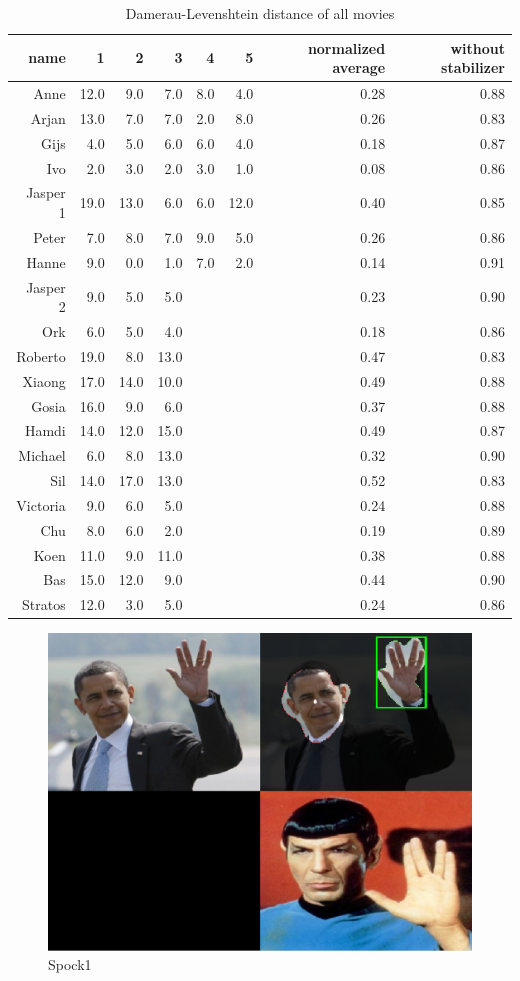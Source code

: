 \begin{table}
\centering
\begin{tabular}{rrrrrrrr}
\hline
name	& 1 & 2 & 3 & 4 & 5 & normalized average & without stabilizer\\
\hline
Anne		&	12.0	&	9.0		&	7.0		&	8.0	&	4.0	&	0.28 & 0.88 \\
Arjan		&	13.0	&	7.0		&	7.0		&	2.0	&	8.0	&	0.26 & 0.83 \\
Gijs		&	4.0		&	5.0		&	6.0		&	6.0	&	4.0	&	0.18 & 0.87 \\
Ivo			&	2.0		&	3.0		&	2.0		&	3.0	&	1.0	&	0.08 & 0.86 \\
Jasper 1	&	19.0	&	13.0	&	6.0		&	6.0	&	12.0 &	0.40 & 0.85 \\
Peter		&	7.0		&	8.0		&	7.0		&	9.0	&	5.0	&	0.26 & 0.86 \\
Hanne		&	9.0		&	0.0		&	1.0		&	7.0	&	2.0	&	0.14 & 0.91 \\
Jasper 2	&	9.0		&	5.0		&	5.0 	& & & 0.23 & 0.90 \\
Ork			&	6.0		&	5.0		&	4.0		& & & 0.18 & 0.86 \\
Roberto		&	19.0	&	8.0		&	13.0	& & & 0.47 & 0.83 \\
Xiaong		&	17.0	&	14.0	&	10.0	& & & 0.49 & 0.88 \\
\hline
Gosia		&	16.0	&	9.0		&	6.0		& & & 0.37 & 0.88 \\
Hamdi		&	14.0	&	12.0	&	15.0	& & & 0.49 & 0.87 \\
Michael		&	6.0		&	8.0		&	13.0	& & & 0.32 & 0.90 \\
Sil			&	14.0	&	17.0	&	13.0	& & & 0.52 & 0.83 \\
Victoria	&	9.0		&	6.0		&	5.0		& & & 0.24 & 0.88 \\
Chu			&	8.0		&	6.0		&	2.0 	& & & 0.19 & 0.89 \\
\hline
Koen		&	11.0	&	9.0		&	11.0 	& & & 0.38 & 0.88\\
Bas			&	15.0	&	12.0	&	9.0		& & & 0.44 & 0.90 \\
Stratos		&	12.0	&	3.0		&	5.0		& & & 0.24 & 0.86 \\

\hline
\end{tabular}
\caption{Damerau-Levenshtein distance of all movies}
\label{tab:distance}
\end{table}

\begin{figure}[htbp]
	\center{}
	\includegraphics[width=0.3\linewidth]{figures/spock1.png}
	\caption{Spock1}
	\label{fig:spock1}
\end{figure}

